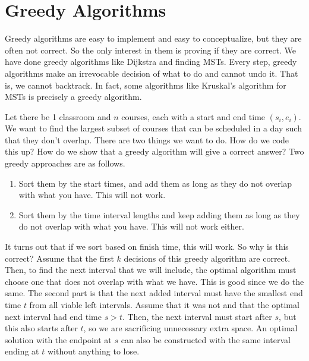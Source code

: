 \section{Greedy Algorithms}

  Greedy algorithms are easy to implement and easy to conceptualize, but they are often not correct. So the only interest in them is proving if they are correct. We have done greedy algorithms like Dijkstra and finding MSTs. Every step, greedy algorithms make an irrevocable decision of what to do and cannot undo it. That is, we cannot backtrack. In fact, some algorithms like Kruskal's algorithm for MSTs is precisely a greedy algorithm. 
  
  \begin{example}
    \label{ex:interval-scheduling}
    Let there be 1 classroom and $n$ courses, each with a start and end time $(s_i, e_i)$. We want to find the largest subset of courses that can be scheduled in a day such that they don't overlap. There are two things we want to do. How do we code this up? How do we show that a greedy algorithm will give a correct answer? Two greedy approaches are as follows. 
    \begin{enumerate}
      \item Sort them by the start times, and add them as long as they do not overlap with what you have. This will not work. 
      \item Sort them by the time interval lengths and keep adding them as long as they do not overlap with what you have. This will not work either. 
    \end{enumerate}
    It turns out that if we sort based on finish time, this will work. So why is this correct? Assume that the first $k$ decisions of this greedy algorithm are correct. Then, to find the next interval that we will include, the optimal algorithm must choose one that does not overlap with what we have. This is good since we do the same. The second part is that the next added interval must have the smallest end time $t$ from all viable left intervals. Assume that it was not and that the optimal next interval had end time $s > t$. Then, the next interval must start after $s$, but this also starts after $t$, so we are sacrificing unnecessary extra space. An optimal solution with the endpoint at $s$ can also be constructed with the same interval ending at $t$ without anything to lose. 


\end{example}
